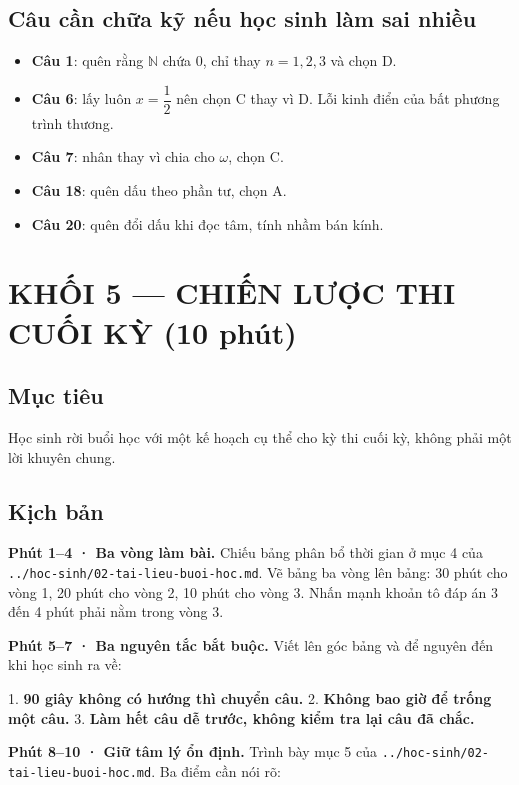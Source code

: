 \documentclass[11pt, a4paper]{article}
\begin{document}
\subsection{Câu cần chữa kỹ nếu học sinh làm sai nhiều}

\begin{itemize}[leftmargin=1.4em, itemsep=2pt]
\item \textbf{Câu 1}: quên rằng $\mathbb{N}$ chứa $0$, chỉ thay $n = 1, 2, 3$ và chọn D.
\item \textbf{Câu 6}: lấy luôn $x = \dfrac{1}{2}$ nên chọn C thay vì D. Lỗi kinh điển của bất phương trình thương.
\item \textbf{Câu 7}: nhân thay vì chia cho $\omega$, chọn C.
\item \textbf{Câu 18}: quên dấu theo phần tư, chọn A.
\item \textbf{Câu 20}: quên đổi dấu khi đọc tâm, tính nhầm bán kính.
\end{itemize}

\section{KHỐI 5 — CHIẾN LƯỢC THI CUỐI KỲ (10 phút)}

\subsection{Mục tiêu}

Học sinh rời buổi học với một kế hoạch cụ thể cho kỳ thi cuối kỳ, không phải một lời khuyên chung.

\subsection{Kịch bản}

\textbf{Phút 1–4 · Ba vòng làm bài.} Chiếu bảng phân bổ thời gian ở mục 4 của \texttt{../hoc-sinh/02-tai-lieu-buoi-hoc.md}. Vẽ bảng ba vòng lên bảng: 30 phút cho vòng 1, 20 phút cho vòng 2, 10 phút cho vòng 3. Nhấn mạnh khoản tô đáp án 3 đến 4 phút phải nằm trong vòng 3.

\textbf{Phút 5–7 · Ba nguyên tắc bắt buộc.} Viết lên góc bảng và để nguyên đến khi học sinh ra về:

1. \textbf{90 giây không có hướng thì chuyển câu.}
2. \textbf{Không bao giờ để trống một câu.}
3. \textbf{Làm hết câu dễ trước, không kiểm tra lại câu đã chắc.}

\textbf{Phút 8–10 · Giữ tâm lý ổn định.} Trình bày mục 5 của \texttt{../hoc-sinh/02-tai-lieu-buoi-hoc.md}. Ba điểm cần nói rõ:
\end{document}
